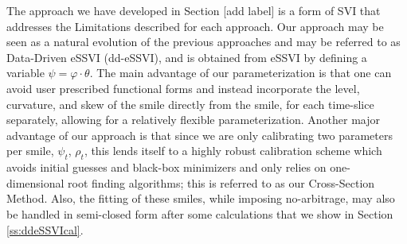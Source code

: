 \documentclass[11pt,letterpaper]{article}
\begin{document}
The approach we have developed in Section [add label] is a form of SVI that addresses the Limitations described for each approach. Our approach may be seen as a natural evolution of the previous approaches and may be referred to as Data-Driven eSSVI (dd-eSSVI), and is obtained from eSSVI by defining a variable $\psi = \varphi \cdot \theta$. The main advantage of our parameterization is that one can avoid user prescribed functional forms and instead incorporate the level, curvature, and skew of the smile directly from the smile, for each time-slice separately, allowing for a relatively flexible parameterization. Another major advantage of our approach is that since we are only calibrating two parameters per smile, $\psi_t$, $\rho_t$, this lends itself to a highly robust calibration scheme which avoids initial guesses and black-box minimizers and only relies on one-dimensional root finding algorithms; this is referred to as our Cross-Section Method. Also, the fitting of these smiles, while imposing no-arbitrage, may also be handled in semi-closed form after some calculations that we show in Section \ref{ss:ddeSSVIcal}. 


\end{document}
